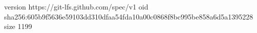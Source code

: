 version https://git-lfs.github.com/spec/v1
oid sha256:605b9f5636e59103dd310dfaa54fda10a00c0868f8bc995be858a6d5a1395228
size 1199
